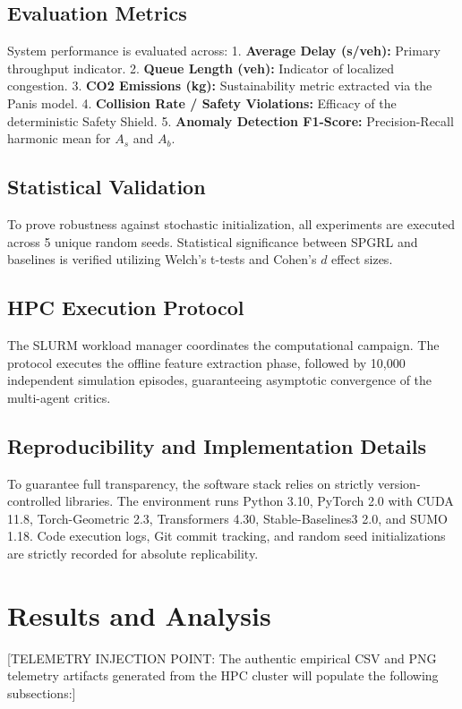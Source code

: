 \documentclass[journal]{IEEEtran}
\begin{document}
\subsection{Evaluation Metrics}
System performance is evaluated across:
1. \textbf{Average Delay (s/veh):} Primary throughput indicator.
2. \textbf{Queue Length (veh):} Indicator of localized congestion.
3. \textbf{CO2 Emissions (kg):} Sustainability metric extracted via the Panis model.
4. \textbf{Collision Rate / Safety Violations:} Efficacy of the deterministic Safety Shield.
5. \textbf{Anomaly Detection F1-Score:} Precision-Recall harmonic mean for $A_s$ and $A_b$.

\subsection{Statistical Validation}
To prove robustness against stochastic initialization, all experiments are executed across 5 unique random seeds. Statistical significance between SPGRL and baselines is verified utilizing Welch's t-tests and Cohen's $d$ effect sizes.

\subsection{HPC Execution Protocol}
The SLURM workload manager coordinates the computational campaign. The protocol executes the offline feature extraction phase, followed by 10,000 independent simulation episodes, guaranteeing asymptotic convergence of the multi-agent critics.

\subsection{Reproducibility and Implementation Details}
To guarantee full transparency, the software stack relies on strictly version-controlled libraries. The environment runs Python 3.10, PyTorch 2.0 with CUDA 11.8, Torch-Geometric 2.3, Transformers 4.30, Stable-Baselines3 2.0, and SUMO 1.18. Code execution logs, Git commit tracking, and random seed initializations are strictly recorded for absolute replicability.

\section{Results and Analysis}
\label{sec:results}
[TELEMETRY INJECTION POINT: The authentic empirical CSV and PNG telemetry artifacts generated from the HPC cluster will populate the following subsections:]
\end{document}
